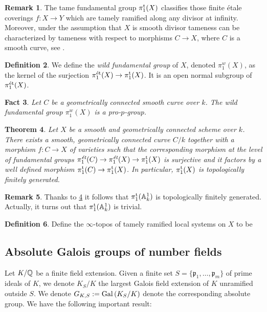 \documentclass[10pt,a4paper]{amsart}
\numberwithin{equation}{subsection}
\theoremstyle{plain}
\newtheorem{theorem}{Theorem}[section]
\newtheorem{fact}[theorem]{Fact}
\theoremstyle{definition}
\newtheorem{defi}[theorem]{Definition}
\newtheorem{rema}[theorem]{Remark}
\theoremstyle{remark}
\numberwithin{equation}{section}
\begin{document}
\begin{rema}
The tame fundamental group $\pi_1^{\mathrm{t}}(X)$ classifies those finite \'etale coverings $f \colon X \to Y$ which are tamely ramified
along any divisor at infinity. Moreover, under the assumption that $X$ is smooth divisor tameness can be characterized
by tameness with respect to morphisms $C \to X$, where $C$ is a smooth curve, see \cite[Appendix 1]{cadoret}.
\end{rema}

\begin{defi}
We define the \emph{wild fundamental group} of $X$, denoted $\pi_1^w(X)$, as the kernel of the surjection $\pi_1^{\text{\'et}}(X) \to
\pi_1^{\mathrm{t}}(X)$. It is an open normal subgroup of $\pi_1^{\text{\'et}}(X)$.
\end{defi}

\begin{fact}
Let $C$ be a geometrically connected smooth curve over $k$. The wild fundamental group $\pi_1^w(X)$ is a pro-$p$-group.
\end{fact}

\begin{theorem}{\cite[Appendix 1, Theorem 1]{cadoret}} \label{cadoret}
Let $X$ be a smooth and geometrically connected scheme over $k$. There exists a smooth, geometrically connected curve
$C/ k$ together with a morphism $f \colon C \to X$ of varieties such that the corresponding morphism at the level of
fundamental groups $\pi_1^{\emph{\text{\'et}}}(C) \to \pi_1^{\emph{\text{\'et}}}(X) \to \pi_1^{\mathrm{t}}(X)$ is surjective and it factors by a well defined morphism
$\pi_1^{\mathrm{t}}(C) \to \pi_1^{\mathrm{t}}(X)$. In particular, $\pi_1^{\mathrm{t}}(X)$ is topologically finitely generated.
\end{theorem}

\begin{rema}
Thanks to \cref{cadoret} it follows that $\pi_1^{\mathrm{t}} (\mathbb A^1_k)$ is topologically finitely generated. Actually, it turns out that $\pi_1^{\mathrm{t}}(\mathbb A^1_k)$ is trivial.
\end{rema}

\begin{defi}
Define the $\infty$-topos of tamely ramified local systems on $X$ to be 
\end{defi}

\subsection{Absolute Galois groups of number fields} Let $K / \mathbb{Q}$ be a finite field extension. Given a finite set $S = \{ \mathfrak p_1, \dots, \mathfrak p_m \}$ of prime ideals of $K$, we denote $K_S / K$ the largest Galois field extension of $K$ unramified outside
$S$. We denote $G_{K, S} : = \mathrm{Gal} \left( K_S / K \right)$ denote the corresponding absolute group. We have the following important result:
\end{document}
